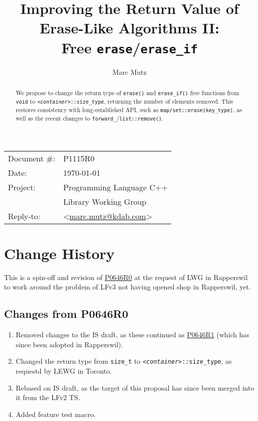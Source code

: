 \documentclass[11pt]{article}
\date{}
\title{Improving the Return Value of Erase-Like Algorithms II:\\ Free
  \texttt{erase}/\texttt{erase\_if}}
\makeatletter
\newcommand{\emailaddress}{marc.mutz@kdab.com}
\newcommand{\email}{\href{mailto:\emailaddress}{\emailaddress}}
\newcommand{\wgpaper}[1]{\href{https://wg21.link/#1}{#1}}
\newcommand{\cst}{\texttt{\textit{<container>}::size\_type}}
\makeatother
\begin{document}
\maketitle\vspace{-2cm}

\begin{tabular}{ll}
  Document \#:&P1115R0\\
  Date:       &\today\\
  Project:    &Programming Language C++\\
              &Library Working Group\\
  Reply-to:   &\author{Marc Mutz} \textless\email\textgreater
\end{tabular}
\vspace{1cm}
\begin{abstract}
  We propose to change the return type of \texttt{erase()} and
  \texttt{erase\_if()} free functions from \texttt{void} to \cst,
  returning the number of elements removed. This restores consistency
  with long-established API, such as
  \texttt{map/set::erase(key\_type)}, as well as the recent changes to
  \texttt{forward\_}/\texttt{list::remove()}.
\end{abstract}


\tableofcontents

\section{Change History}

This is a spin-off and revision of \wgpaper{P0646R0} at the request of
LWG in Rapperswil to work around the problem of LFv3 not having opened
shop in Rapperswil, yet.

\subsection{Changes from P0646R0}

\begin{enumerate}
\item Removed changes to the IS draft, as these continued as
  \wgpaper{P0646R1} (which has since been adopted in Rapperswil).
\item Changed the return type from \texttt{size\_t} to
  \cst, as requestd by LEWG in Toronto.
\item Rebased on IS draft, as the target of this proposal has since
  been merged into it from the LFv2 TS.
\item Added feature test macro.
\end{enumerate}
\end{document}
